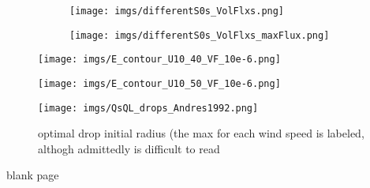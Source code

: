 \documentclass[17pt,a4paper]{article}
\begin{document}
\begin{figure}[h!]
\begin{subfigure}[t]{\textwidth}
\texttt{[image: imgs/differentS0s\_VolFlxs.png]}
\end{subfigure}
\begin{subfigure}[t]{\textwidth}
\texttt{[image: imgs/differentS0s\_VolFlxs\_maxFlux.png]}
\end{subfigure}
\end{figure}

\begin{figure}[!h]
\centering
\texttt{[image: imgs/E\_contour\_U10\_40\_VF\_10e-6.png]}
\end{figure}
\begin{figure}[!h]
\centering
\texttt{[image: imgs/E\_contour\_U10\_50\_VF\_10e-6.png]}
\end{figure}

\begin{figure}[!h]
\centering
\texttt{[image: imgs/QsQL\_drops\_Andres1992.png]}
\caption{optimal drop initial radius (the max for each wind speed is labeled, althogh admittedly is difficult to read\label{Fig:optimalDrop}}
\end{figure}



\newpage

blank page

\newpage



\end{document}
